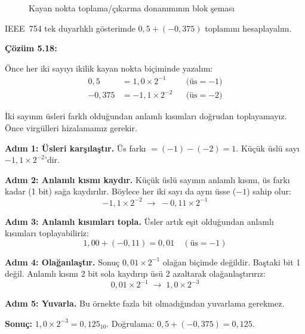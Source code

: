 \begin{figure}[htbp]
\caption{Kayan nokta toplama/çıkarma donanımının blok şeması}
\label{fig:kayan-nokta-toplama-donanim}
\end{figure}

\FloatBarrier
\begin{ornek}[5.18]
IEEE~754 tek duyarlıklı gösterimde $0{,}5 + (-0{,}375)$ toplamını hesaplayalım.

\textbf{Çözüm 5.18:}

Önce her iki sayıyı ikilik kayan nokta biçiminde yazalım:
\begin{align*}
0{,}5  &= 1{,}0 \times 2^{-1}  &&\text{(üs} = -1\text{)} \\
-0{,}375 &= -1{,}1 \times 2^{-2} &&\text{(üs} = -2\text{)}
\end{align*}

İki sayının üsleri farklı olduğundan anlamlı kısımları doğrudan toplayamayız. Önce virgülleri hizalamamız gerekir.

\textbf{Adım 1: Üsleri karşılaştır.} Üs farkı $= (-1) - (-2) = 1$. Küçük üslü sayı $-1{,}1 \times 2^{-2}$'dir.

\textbf{Adım 2: Anlamlı kısmı kaydır.} Küçük üslü sayının anlamlı kısmı, üs farkı kadar (1 bit) sağa kaydırılır. Böylece her iki sayı da aynı üsse ($-1$) sahip olur:
\[
-1{,}1 \times 2^{-2} \;\longrightarrow\; -0{,}11 \times 2^{-1}
\]

\textbf{Adım 3: Anlamlı kısımları topla.} Üsler artık eşit olduğundan anlamlı kısımları toplayabiliriz:
\[
1{,}00 + (-0{,}11) = 0{,}01 \quad (\text{üs} = -1)
\]

\textbf{Adım 4: Olağanlaştır.} Sonuç $0{,}01 \times 2^{-1}$ olağan biçimde değildir. Baştaki bit 1 değil. Anlamlı kısmı 2 bit sola kaydırıp üsü 2 azaltarak olağanlaştırırız:
\[
0{,}01 \times 2^{-1} \;\longrightarrow\; 1{,}0 \times 2^{-3}
\]

\textbf{Adım 5: Yuvarla.} Bu örnekte fazla bit olmadığından yuvarlama gerekmez.

\textbf{Sonuç:} $1{,}0 \times 2^{-3} = 0{,}125_{10}$. Doğrulama: $0{,}5 + (-0{,}375) = 0{,}125$. \checkmark
\end{ornek}

